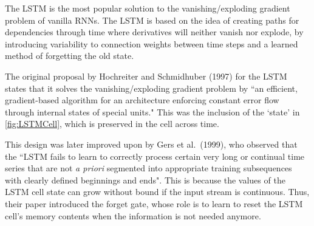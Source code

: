 \documentclass[12pt,a4paper,twoside,openright]{report}
\begin{document}
The LSTM is the most popular solution to the vanishing/exploding
gradient problem of vanilla RNNs. The LSTM is based on the
idea of creating paths for dependencies through time where derivatives will neither vanish
nor explode, by introducing variability to connection weights between time steps and a learned
method of forgetting the old state.

The original proposal by Hochreiter and Schmidhuber (1997) for the LSTM states that it solves the
vanishing/exploding gradient problem by ``an efficient, gradient-based algorithm for
an architecture enforcing constant
error flow through internal states of special units."\cite{Hochreiter97}
This was the inclusion of the `state' in \cref{fig:LSTMCell}, which
is preserved in the cell across time.

This design was later improved upon by Gers et al.\ (1999),
who observed that the ``LSTM fails to learn to correctly process certain
very long or continual time series that are not \textit{a priori} segmented into 
appropriate training subsequences with clearly defined beginnings and ends"\cite{Gers99}.
This is because the values of the LSTM cell state can grow without bound if the
input stream is continuous. Thus, their paper introduced the forget gate,
whose role is to learn to reset the LSTM cell's memory contents when
the information is not needed anymore.
\end{document}
